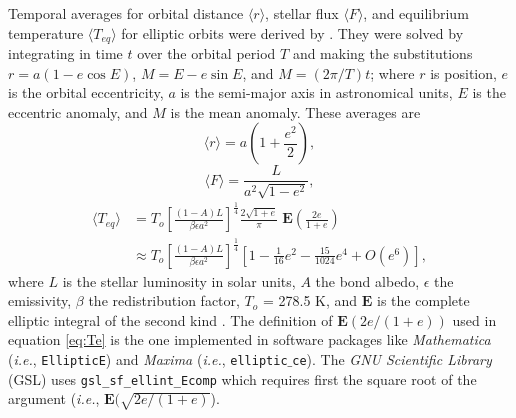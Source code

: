 \documentclass[a4paper,fleqn,usenatbib]{mnras}
\begin{document}
Temporal averages for orbital distance $\langle r \rangle$, stellar flux $\langle F \rangle$, and equilibrium temperature $\langle T_{eq} \rangle$ for elliptic orbits were derived by \citet{2017ApJ...837L...1M}. They were solved by integrating in time $t$ over the orbital period $T$ and making the substitutions $r=a(1-e\cos{E})$, $M=E-e\sin{E}$, and $M=(2\pi/T)t$; where $r$ is position, $e$ is the orbital eccentricity, $a$ is the semi-major axis in astronomical units, $E$ is the eccentric anomaly, and $M$ is the mean anomaly. These averages are
\begin{equation} \label{eq:re}
\langle r \rangle = a\left ( 1+\frac{e^2}{2} \right ),
\end{equation}
\begin{equation} \label{eq:Fe}
\langle F \rangle = \frac{L}{a^2\sqrt{1-e^2}},
\end{equation}
\begin{align} \label{eq:Te}
\langle T_{eq} \rangle & = T_o\left[ \frac{(1-A)L}{\beta \epsilon a^2}\right] ^\frac{1}{4}\frac{2\sqrt{1+e}}{\pi} \; \mathbf{E}\left ( \frac{2e}{1+e} \right ) \\
& \approx T_o\left[ \frac{(1-A)L}{\beta \epsilon a^2}\right] ^\frac{1}{4} \left[ 1 - \tfrac{1}{16}e^2 - \tfrac{15}{1024}e^4 + O(e^6) \right],
\end{align}
where $L$ is the stellar luminosity in solar units, $A$ the bond albedo, $\epsilon$ the emissivity, $\beta$ the redistribution factor, $T_o$ = 278.5 K, and $\mathbf{E}$ is the complete elliptic integral of the second kind \citep{MathWorld, GSL}. The definition of $\mathbf{E}(2e/(1+e))$ used in equation \ref{eq:Te} is the one implemented in software packages like \emph{Mathematica} (\emph{i.e.}, \texttt{EllipticE}) and \emph{Maxima} (\emph{i.e.}, \texttt{elliptic$\_$ce}). The \emph{GNU Scientific Library} (GSL) uses \texttt{gsl\_sf\_ellint\_Ecomp} which requires first the square root of the argument (\emph{i.e.}, $\mathbf{E}(\sqrt{2e/(1+e)}$).
\end{document}

